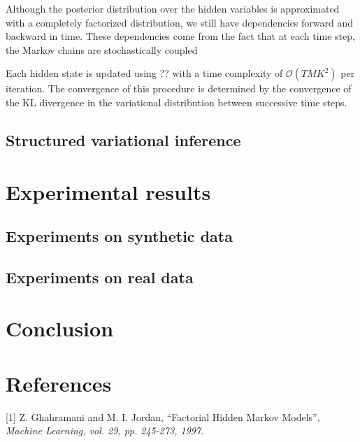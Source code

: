 \documentclass{article}
\begin{document}
Although the posterior distribution over the hidden variables is approximated with a completely factorized distribution, we still have dependencies forward and backward in time. These dependencies come from the fact that at each time step, the Markov chains are stochastically coupled

Each hidden state is updated using ?? with a time complexity of $\mathcal{O}(T M K^2)$ per iteration. The convergence of this procedure is determined by the convergence of the KL divergence in the variational distribution between successive time steps.

\subsection{Structured variational inference}

\section{Experimental results}

\subsection{Experiments on synthetic data}

\subsection{Experiments on real data}

\section{Conclusion}

\section*{References}

\small

[1] Z. Ghahramani and M. I. Jordan, ``Factorial Hidden Markov Models'', \it{Machine Learning}, vol. 29, pp. 245-273, 1997.
\end{document}
